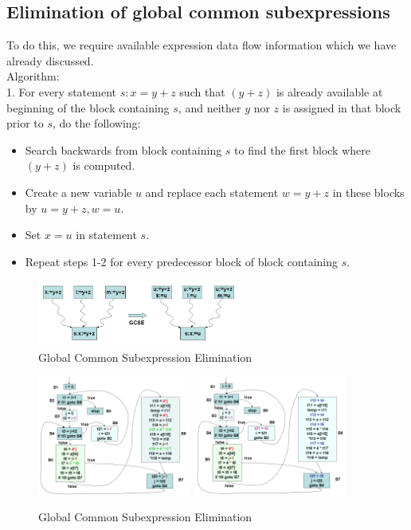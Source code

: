 \documentclass{article}
\begin{document}
\subsection*{Elimination of global common subexpressions}
To do this, we require available expression data flow information which we have already discussed. \\
Algorithm: \\
1. For every statement $s: x = y+z$ such that $(y+z)$ is already available at beginning of the block containing $s$, and neither $y$ nor $z$ is assigned in that block prior to $s$, do the following:
\begin{itemize}
    \item Search backwards from block containing $s$ to find the first block where $(y+z)$ is computed.
    \item Create a new variable $u$ and replace each statement $w = y+z$ in these blocks by $u = y+z, w = u$.
    \item Set $x = u$ in statement $s$.
    \item Repeat steps 1-2 for every predecessor block of block containing $s$.
\end{itemize}

\begin{figure}[h]
    \centering
    \includegraphics[width=0.6\textwidth]{Images/GCSE.png}
    \caption{Global Common Subexpression Elimination}
    \label{fig:GlobalCSE}
\end{figure}

\begin{figure}[h]
    \centering
    \includegraphics[width=0.45\textwidth]{Images/GCSE2.png}
    \includegraphics[width=0.45\textwidth]{Images/GCSE3.png}
    \caption{Global Common Subexpression Elimination}
    \label{fig:GlobalCSE}
\end{figure}
\end{document}
